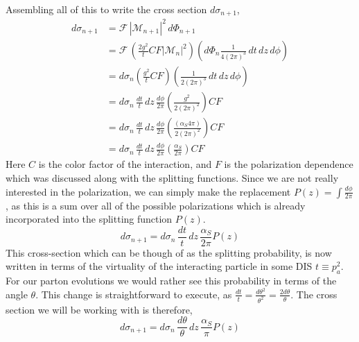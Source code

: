 \documentclass[main.tex]{subfiles}
\begin{document}
Assembling all of this to write the cross section \(d\sigma_{n+1}\),
\begin{align}
    d\sigma_{n+1} &= \mathcal{F} \,|\mathcal{M}_{n+1}|^2 \,d\Phi_{n+1} \nonumber\\
    &= \mathcal{F} \,\left( \frac{2g^2}{t} CF|\mathcal{M}_n|^2 \right) \left( d\Phi_n \frac{1}{4 (2\pi)^3} \, dt\, dz \, d\phi  \right) \nonumber \\
    &= d\sigma_n  \left( \frac{g^2}{t} CF\right) \left( \frac{1}{2 (2\pi)^3} \, dt\, dz \, d\phi  \right) \nonumber \\
    &= d\sigma_n \, \frac{dt}{t}\, dz \, \frac{d\phi}{2\pi} \left( \frac{g^2}{2(2\pi)^2} \right) CF \nonumber\\
    &= d\sigma_n \, \frac{dt}{t}\, dz \, \frac{d\phi}{2\pi} \left( \frac{(\alpha_S 4\pi)}{2(2\pi)^2} \right) CF \nonumber\\
    &= d\sigma_n \, \frac{dt}{t}\, dz \, \frac{d\phi}{2\pi} (\frac{\alpha_S }{2\pi} ) CF
\end{align}
Here \(C\) is the color factor of the interaction, and \(F\) is the polarization dependence which was discussed along with the splitting functions. Since we are not really interested in the polarization, we can simply make the replacement \(P(z) = \int \frac{d\phi}{2\pi}\), as this is a sum over all of the possible polarizations which is already incorporated into the splitting function \(P(z)\).
\begin{equation}
    d\sigma_{n+1}= d\sigma_n \, \frac{dt}{t}\, dz \, \frac{\alpha_S }{2\pi} P(z)
\end{equation}
This cross-section which can be though of as the splitting probability, is now written in terms of the virtuality of the interacting particle in some DIS \(t \equiv p_a^2\). For our parton evolutions we would rather see this probability in terms of the angle \(\theta\). This change is straightforward to execute, as \(\frac{dt}{t} = \frac{d\theta^2}{\theta^2} = \frac{2 d\theta}{\theta} \). The cross section we will be working with is therefore, 
\begin{equation}\label{eqn: branching_cross_section}
    d\sigma_{n+1}= d\sigma_n \, \frac{d\theta}{\theta}\, dz \, \frac{\alpha_S }{\pi} P(z)
\end{equation}
\end{document}
